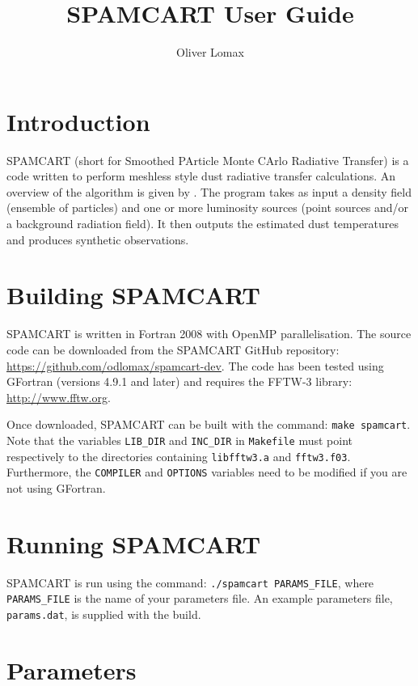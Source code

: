 \documentclass[11pt]{article}
\title{SPAMCART User Guide}
\author{Oliver Lomax}
\begin{document}
\maketitle

\section{Introduction}

SPAMCART (short for Smoothed PArticle Monte CArlo Radiative Transfer) is a code written to perform meshless \citet{Lucy99} style dust radiative transfer calculations. An overview of the algorithm is given by \citet{LW16}. The program takes as input a density field (ensemble of particles) and one or more luminosity sources (point sources and/or a background radiation field). It then outputs the estimated dust temperatures and produces synthetic observations.

\section{Building SPAMCART}

SPAMCART is written in Fortran 2008 with OpenMP parallelisation. The source code can be downloaded from the SPAMCART GitHub repository: \url{https://github.com/odlomax/spamcart-dev}. The code has been tested using GFortran (versions 4.9.1 and later) and requires the FFTW-3 library: \url{http://www.fftw.org}.

Once downloaded, SPAMCART can be built with the command: \texttt{make spamcart}. Note that the variables \texttt{LIB\_DIR} and \texttt{INC\_DIR} in \texttt{Makefile} must point respectively to the directories containing \texttt{libfftw3.a} and \texttt{fftw3.f03}. Furthermore, the \texttt{COMPILER} and \texttt{OPTIONS} variables need to be modified if you are not using GFortran.

\section{Running SPAMCART}

SPAMCART is run using the command: \texttt{./spamcart PARAMS\_FILE}, where \texttt{PARAMS\_FILE} is the name of your parameters file. An example parameters file, \texttt{params.dat}, is supplied with the build.

\section{Parameters}
\end{document}
